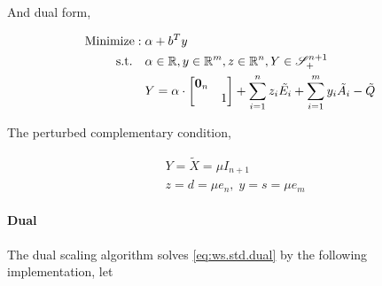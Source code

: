 \documentclass[../main]{subfiles}
\begin{document}
And dual form,

\begin{equation} \label{eq:ws.std.dual}
    \begin{aligned}
        \mathrm{Minimize:\;}           & \alpha + b^Ty                                                                           \\
        \mathrm{s.t.} \quad & \alpha \in \mathbb{R}, y \in \mathbb{R}^m, z\in \mathbb{R}^n, Y  \in \mathscr S^{n+1}_+ \\
                            & Y =\alpha \cdot \begin{bmatrix}  \bm 0_n &  \\  & 1  \end{bmatrix}
        + \sum_{i=1}^{n} z_{i} \tilde{E_i}
        + \sum_{i=1}^{m} y_{i} \tilde{A_i}
        - \tilde{Q}
    \end{aligned}
\end{equation}

The perturbed complementary condition,

\begin{equation} \label{eq:ws.std.lc}
    \begin{aligned}
         & Y = \tilde X = \mu I_{n+1}           \\
         & z = d =  \mu e_n, \; y = s = \mu e_m
    \end{aligned}
\end{equation}



\paragraph{Dual}
The dual scaling algorithm \cite{benson_solving_2000} solves \eqref{eq:ws.std.dual} by the following implementation, let
\end{document}
